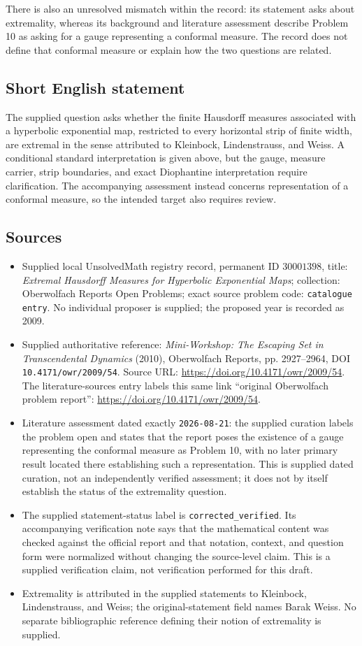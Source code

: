 \documentclass[11pt]{article}
\begin{document}
There is also an unresolved mismatch within the record: its statement asks about extremality, whereas its background and literature assessment describe Problem 10 as asking for a gauge representing a conformal measure. The record does not define that conformal measure or explain how the two questions are related.
\subsection{Short English statement}
The supplied question asks whether the finite Hausdorff measures associated with a hyperbolic exponential map, restricted to every horizontal strip of finite width, are extremal in the sense attributed to Kleinbock, Lindenstrauss, and Weiss. A conditional standard interpretation is given above, but the gauge, measure carrier, strip boundaries, and exact Diophantine interpretation require clarification. The accompanying assessment instead concerns representation of a conformal measure, so the intended target also requires review.
\subsection{Sources}
\begin{itemize}
\item Supplied local UnsolvedMath registry record, permanent ID \(30001398\), title: \emph{Extremal Hausdorff Measures for Hyperbolic Exponential Maps}; collection: Oberwolfach Reports Open Problems; exact source problem code: \texttt{catalogue entry}. No individual proposer is supplied; the proposed year is recorded as 2009.
\item Supplied authoritative reference: \emph{Mini-Workshop: The Escaping Set in Transcendental Dynamics} (2010), Oberwolfach Reports, pp. 2927--2964, DOI \texttt{10.4171/owr/2009/54}. Source URL: \url{https://doi.org/10.4171/owr/2009/54}. The literature-sources entry labels this same link ``original Oberwolfach problem report'': \url{https://doi.org/10.4171/owr/2009/54}.
\item Literature assessment dated exactly \texttt{2026-08-21}: the supplied curation labels the problem open and states that the report poses the existence of a gauge representing the conformal measure as Problem 10, with no later primary result located there establishing such a representation. This is supplied dated curation, not an independently verified assessment; it does not by itself establish the status of the extremality question.
\item The supplied statement-status label is \texttt{corrected\_verified}. Its accompanying verification note says that the mathematical content was checked against the official report and that notation, context, and question form were normalized without changing the source-level claim. This is a supplied verification claim, not verification performed for this draft.
\item Extremality is attributed in the supplied statements to Kleinbock, Lindenstrauss, and Weiss; the original-statement field names Barak Weiss. No separate bibliographic reference defining their notion of extremality is supplied.
\end{itemize}
\end{document}
